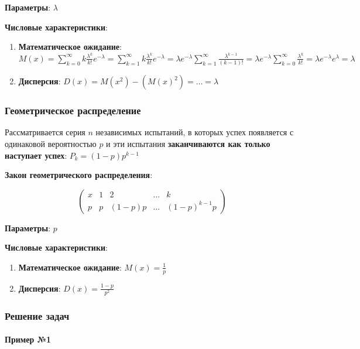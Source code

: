 \documentclass{article}
\begin{document}
\textbf{Параметры}: $\lambda$

\textbf{Числовые характеристики}:

\begin{enumerate}
    \item \textbf{Математическое ожидание}:
    $M(x) = \sum\limits_{k = 0}^{\infty} k \frac{\lambda^{k}}{k!} e^{-\lambda} = \sum\limits_{k = 1}^{\infty} k \frac{\lambda^{k}}{k!} e^{-\lambda} = \lambda e^{-\lambda} \sum\limits_{k = 1}^{\infty} \frac{\lambda^{k - 1}}{(k - 1)!} = \lambda e^{-\lambda} \sum\limits_{k = 0}^{\infty} \frac{\lambda^{k}}{k!} = \lambda e^{-\lambda} e^{\lambda} = \lambda$
    \item \textbf{Дисперсия}:
    $D(x) = M(x^2) - (M(x)^2)=\dots=\lambda$
\end{enumerate}

\subsubsection{Геометрическое распределение}

Рассматривается серия $n$ независимых испытаний, в которых успех появляется с одинаковой вероятностью $p$ и эти испытания \textbf{заканчиваются как только наступает успех}: $P_{k} = (1-p)p^{k - 1}$

\textbf{Закон геометрического распределения}:

$$
\begin{pmatrix}
    x & 1 & 2 & \dots & k \\
    p & p & (1-p)p & \dots & (1-p)^{k - 1}p
\end{pmatrix}
$$

\textbf{Параметры}: $p$

\textbf{Числовые характеристики}:

\begin{enumerate}
    \item \textbf{Математическое ожидание}: $M(x) = \frac{1}{p}$
    \item \textbf{Дисперсия}: $D(x) = \frac{1-p}{p^2}$
\end{enumerate}

\subsubsection{Решение задач}

\paragraph{Пример №1}
\end{document}
